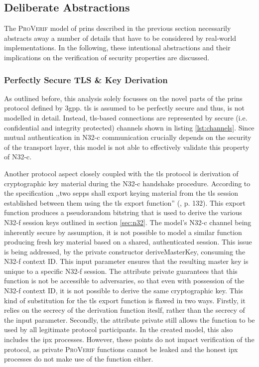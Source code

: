 \subsection{Deliberate Abstractions}
\label{ssec:abstractions}

The \textsc{ProVerif} model of \gls{prins} described in the previous section necessarily abstracts away a number of details that have to be considered by real-world implementations.
In the following, these intentional abstractions and their implications on the verification of security properties are discussed.

\subsubsection{Perfectly Secure TLS \& Key Derivation}

As outlined before, this analysis solely focusses on the novel parts of the \gls{prins} protocol defined by \gls{3gpp}.
\gls{tls} is assumed to be perfectly secure and thus, is not modelled in detail.
Instead, \gls{tls}-based connections are represented by secure (i.e. confidential and integrity protected) channels shown in listing \ref{lst:channels}.
Since mutual authentication in N32-c communication crucially depends on the security of the transport layer, this model is not able to effectively validate this property of N32-c.

Another protocol aspect closely coupled with the \gls{tls} protocol is derivation of cryptographic key material during the N32-c handshake procedure.
According to the specification ,,two \glspl{sepp} shall export keying material from the \gls{tls} session established between them using the \gls{tls} export function'' (\cite{3gpp.33.501}, p. 132).
This export function produces a pseudorandom bitstring that is used to derive the various N32-f session keys outlined in section \ref{sec:n32}.
The model's N32-c channel being inherently secure by assumption, it is not possible to model a similar function producing fresh key material based on a shared, authenticated session.
This issue is being addressed, by the private constructor {\sffamily deriveMasterKey}, consuming the N32-f context ID.
This input parameter ensures that the resulting master key is unique to a specific N32-f session.
The attribute {\sffamily private} guarantees that this function is not be accessible to adversaries, so that even with possession of the N32-f context ID, it is not possible to derive the same cryptographic key.
This kind of substitution for the \gls{tls} export function is flawed in two ways. Firstly, it relies on the secrecy of the derivation function iteslf, rather than the secrecy of the input parameter.
Secondly, the attribute {\sffamily private} still allows the function to be used by all legitimate protocol participants.
In the created model, this also includes the \gls{ipx} processes.
However, these points do not impact verification of the protocol, as private \textsc{ProVerif} functions cannot be leaked and the honest \gls{ipx} processes do not make use of the function either.

